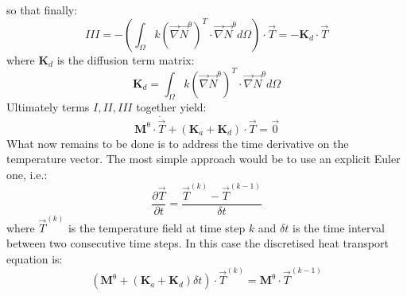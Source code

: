 so that finally:
\[
III = - \left( \int_\Omega k (\vec \nabla \vec N^\uptheta)^T \cdot \vec \nabla \vec N^\uptheta d\Omega \right) \cdot \vec T
= - {\bm K}_d \cdot \vec T
\]
where ${\bm K}_d$ is the diffusion term matrix:
\[
{\bm K}_d = \int_\Omega  k (\vec \nabla \vec N^\uptheta)^T \cdot \vec \nabla \vec N^\uptheta d\Omega 
\]
 Ultimately terms $I,II,III$ together yield:
\[
\boxed{
{\bm M}^\uptheta \cdot \dot{\vec T} + ({\bm K}_a + {\bm K}_d) \cdot \vec T = \vec 0
}
\]
What now remains to be done is to address the time derivative on the temperature vector. 
The most simple approach would be to use an explicit Euler one, i.e.:
\[
\frac{\partial \vec T}{\partial t} = \frac{\vec T^{(k)} - \vec T^{(k-1)}}{\delta t}
\]
where $\vec T^{(k)}$ is the temperature field at time step $k$ and $\delta t$ is the time interval 
between two consecutive time steps.
In this case the discretised heat transport equation is:
\[
\boxed{
\left( {\bm M}^\uptheta  + ({\bm K}_a + {\bm K}_d) \delta t \right) \cdot \vec T^{(k)} =  {\bm M}^\uptheta \cdot \vec T^{(k-1)}
}
\]




